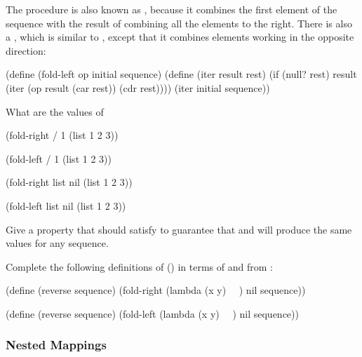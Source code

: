 \begin{exercise}
	\label{Exercise 2.38}
	The  procedure is also known as , because it combines the first element of the sequence with the result of combining all the elements to the right.
	There is also a , which is similar to , except that it combines elements working in the opposite direction:
	\begin{scheme}
	  (define (fold-left op initial sequence)
	    (define (iter result rest)
	      (if (null? rest)
	          result
	          (iter (op result (car rest))
	                (cdr rest))))
	    (iter initial sequence))
	\end{scheme}
	What are the values of
	\begin{scheme}
	  (fold-right / 1 (list 1 2 3))

	  (fold-left / 1 (list 1 2 3))

	  (fold-right list nil (list 1 2 3))

	  (fold-left list nil (list 1 2 3))
	\end{scheme}
	Give a property that  should satisfy to guarantee that  and  will produce the same values for any sequence.
\end{exercise}



\begin{exercise}
	\label{Exercise 2.39}
	Complete the following definitions of  () in terms of  and  from :
	\begin{scheme}
	  (define (reverse sequence)
	    (fold-right (lambda (x y) ~~) nil sequence))

	  (define (reverse sequence)
	    (fold-left (lambda (x y) ~~) nil sequence))
	\end{scheme}
\end{exercise}



\subsubsection*{Nested Mappings}

